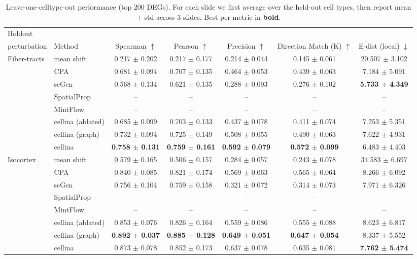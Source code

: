 \begin{table}[t]
\centering
\caption{Leave-one-celltype-out performance (top 200 DEGs). For each slide we first average over the held-out cell types, then report mean $\pm$ std across 3 slides. Best per metric in \textbf{bold}.}
\label{tab:loo_summary_merfish}
\begin{tabular}{llccccc}
\toprule
Holdout \\ perturbation & Method & Spearman $\uparrow$ & Pearson $\uparrow$ & Precision $\uparrow$ & Direction Match (K) $\uparrow$ & E-dist (local) $\downarrow$ \\
\toprule

\multirow[c]{8}{*}{Fiber-tracts} & mean shift & 0.217 $\pm$ 0.202 & 0.217 $\pm$ 0.177 & 0.214 $\pm$ 0.044 & 0.145 $\pm$ 0.061 & 20.507 $\pm$ 3.102 \\
 & CPA & 0.681 $\pm$ 0.094 & 0.707 $\pm$ 0.135 & 0.464 $\pm$ 0.053 & 0.439 $\pm$ 0.063 & 7.184 $\pm$ 5.091 \\
 & scGen & 0.568 $\pm$ 0.134 & 0.621 $\pm$ 0.135 & 0.288 $\pm$ 0.093 & 0.276 $\pm$ 0.102 & \textbf{5.733 $\pm$ 4.349} \\
 & SpatialProp & -- & -- & -- & -- & -- \\
 & MintFlow & -- & -- & -- & -- & -- \\
 & cellina (ablated) & 0.685 $\pm$ 0.099 & 0.703 $\pm$ 0.133 & 0.437 $\pm$ 0.078 & 0.411 $\pm$ 0.074 & 7.253 $\pm$ 5.351 \\
 & cellina (graph) & 0.732 $\pm$ 0.094 & 0.725 $\pm$ 0.149 & 0.508 $\pm$ 0.055 & 0.490 $\pm$ 0.063 & 7.622 $\pm$ 4.931 \\
 & cellina & \textbf{0.758 $\pm$ 0.131} & \textbf{0.759 $\pm$ 0.161} & \textbf{0.592 $\pm$ 0.079} & \textbf{0.572 $\pm$ 0.099} & 6.483 $\pm$ 4.403 \\
\midrule

\multirow[c]{8}{*}{Isocortex} & mean shift & 0.579 $\pm$ 0.165 & 0.506 $\pm$ 0.157 & 0.284 $\pm$ 0.057 & 0.243 $\pm$ 0.078 & 34.583 $\pm$ 6.697 \\
 & CPA & 0.840 $\pm$ 0.085 & 0.821 $\pm$ 0.174 & 0.569 $\pm$ 0.063 & 0.565 $\pm$ 0.064 & 8.266 $\pm$ 6.092 \\
 & scGen & 0.756 $\pm$ 0.104 & 0.759 $\pm$ 0.158 & 0.321 $\pm$ 0.072 & 0.314 $\pm$ 0.073 & 7.971 $\pm$ 6.326 \\
 & SpatialProp & -- & -- & -- & -- & -- \\
 & MintFlow & -- & -- & -- & -- & -- \\
 & cellina (ablated) & 0.853 $\pm$ 0.076 & 0.826 $\pm$ 0.164 & 0.559 $\pm$ 0.086 & 0.555 $\pm$ 0.088 & 8.623 $\pm$ 6.817 \\
 & cellina (graph) & \textbf{0.892 $\pm$ 0.037} & \textbf{0.885 $\pm$ 0.128} & \textbf{0.649 $\pm$ 0.051} & \textbf{0.647 $\pm$ 0.054} & 8.337 $\pm$ 5.552 \\
 & cellina & 0.873 $\pm$ 0.078 & 0.852 $\pm$ 0.173 & 0.637 $\pm$ 0.078 & 0.635 $\pm$ 0.081 & \textbf{7.762 $\pm$ 5.474} \\

\bottomrule
\end{tabular}
\end{table}